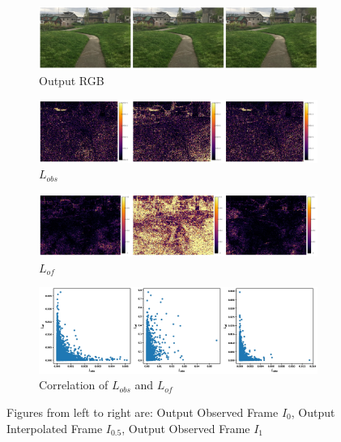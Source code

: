 \documentclass{article}
\begin{document}
\begin{figure}
\centering
\begin{subfigure}{1\textwidth}
	\centering
    \includegraphics[width=1\linewidth]{out_frames.jpg}
    \caption{Output RGB}
\end{subfigure}
\begin{subfigure}{1\textwidth}
	\centering
    \includegraphics[width=1\linewidth]{out_lobs.jpg}
    \caption{$L_{obs}$}
\end{subfigure}
\begin{subfigure}{1\textwidth}
	\centering
    \includegraphics[width=1\linewidth]{out_lof.jpg}
    \caption{$L_{of}$}
\end{subfigure}
\begin{subfigure}{1\textwidth}
	\centering
    \includegraphics[width=1\linewidth]{lobs_lof.jpg}
    \caption{Correlation of $L_{obs}$ and $L_{of}$}
\end{subfigure}
\caption{Figures from left to right are: Output Observed Frame $I_0$, Output Interpolated Frame $I_{0.5}$, Output Observed Frame $I_1$}
\end{figure}
\end{document}
